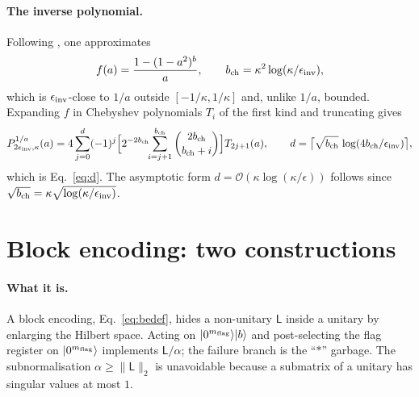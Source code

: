 \documentclass[11pt,a4paper]{article}
\theoremstyle{plain}
\theoremstyle{definition}
\theoremstyle{remark}
\newcommand{\Oh}{\mathcal{O}}
\newcommand{\ket}[1]{\lvert #1 \rangle}
\newcommand{\norm}[1]{\lVert #1 \rVert}
\newcommand{\Lmat}{\mathsf{L}}
\begin{document}
\paragraph{The inverse polynomial.}  Following \cite[Appendix B]{Setty2026}, one
approximates
\begin{equation}
f(a)=\frac{1-(1-a^{2})^{b}}{a},
\qquad b_{\rm ch}=\kappa^{2}\log(\kappa/\epsilon_{\rm inv}),
\end{equation}
which is $\epsilon_{\rm inv}$-close to $1/a$ outside $[-1/\kappa,1/\kappa]$ and,
unlike $1/a$, bounded.  Expanding $f$ in Chebyshev polynomials $T_i$ of the first
kind and truncating gives
\begin{equation}
P^{1/a}_{2\epsilon_{\rm inv},\kappa}(a)
=4\sum_{j=0}^{d}(-1)^{j}\Bigl[2^{-2b_{\rm ch}}\!\!\sum_{i=j+1}^{b_{\rm ch}}
\binom{2b_{\rm ch}}{b_{\rm ch}+i}\Bigr]T_{2j+1}(a),
\qquad
d=\bigl\lceil\sqrt{b_{\rm ch}}\,\log(4b_{\rm ch}/\epsilon_{\rm inv})\bigr\rceil,
\end{equation}
which is Eq.~\eqref{eq:d}.  The asymptotic form $d=\Oh(\kappa\log(\kappa/\epsilon))$
follows since $\sqrt{b_{\rm ch}}=\kappa\sqrt{\log(\kappa/\epsilon_{\rm inv})}$.

\section{Block encoding: two constructions}
\label{app:be}

\paragraph{What it is.}  A block encoding, Eq.~\eqref{eq:bedef}, hides a
non-unitary $\Lmat$ inside a unitary by enlarging the Hilbert space.  Acting on
$\ket{0^{m_{\rm flag}}}\ket{b}$ and post-selecting the flag register on
$\ket{0^{m_{\rm flag}}}$ implements $\Lmat/\alpha$; the failure branch is the
``$\ast$'' garbage.  The subnormalisation $\alpha\ge\norm{\Lmat}_2$ is
unavoidable because a submatrix of a unitary has singular values at most $1$.
\end{document}
